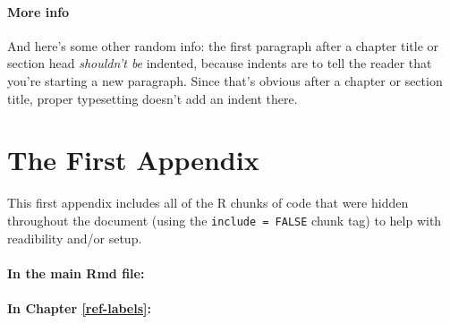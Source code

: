 \documentclass[12pt,twoside]{reedthesis}
\begin{document}
  \subsubsection{More info}\label{more-info}
  
  And here's some other random info: the first paragraph after a chapter
  title or section head \emph{shouldn't be} indented, because indents are
  to tell the reader that you're starting a new paragraph. Since that's
  obvious after a chapter or section title, proper typesetting doesn't add
  an indent there.
  
  \appendix
  
  \chapter{The First Appendix}\label{the-first-appendix}
  
  This first appendix includes all of the R chunks of code that were
  hidden throughout the document (using the \texttt{include\ =\ FALSE}
  chunk tag) to help with readibility and/or setup.
  
  \subsubsection{In the main Rmd file:}\label{in-the-main-rmd-file}
  
  \begin{Shaded}
  \begin{Highlighting}[]
    \NormalTok{(}\NormalTok{, } \NormalTok{)}
    \NormalTok{(}\NormalTok{)}
  \end{Highlighting}
  \end{Shaded}
  
  \subsubsection{In Chapter
  \ref{ref-labels}:}\label{in-chapter-refref-labels}
  
\end{document}
